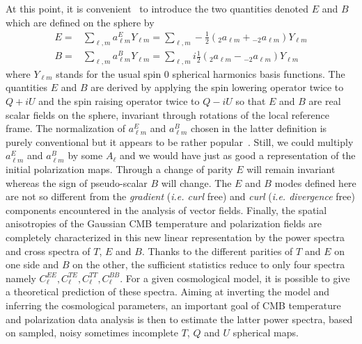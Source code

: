 At this point, it is convenient~\cite{zalda} to introduce the two quantities denoted $E$ and $B$ which are defined on the sphere by 
\begin{eqnarray}\label{EB}
E = &  \sum_{\ell, m}   a_{\ell m} ^E Y_{\ell m} =  \sum_{\ell, m}  - \frac{ 1}{2}   ({_{ 2}a_{\ell m}}  +  {_{- 2}a_{\ell m}} )    Y_{\ell m} \\ \nonumber
B = & \sum_{\ell, m}   a_{\ell m} ^B Y_{\ell m} =  \sum_{\ell, m}  i \frac{ 1}{2}    ({_{ 2}a_{\ell m}}  -  {_{- 2}a_{\ell m}} )   Y_{\ell m} 
\end{eqnarray} 
where $Y_{\ell m}$ stands for the usual spin 0 spherical harmonics basis functions. The quantities $E$ and $B$ are derived by applying 
the spin lowering operator twice to $Q + i U$  and the spin raising operator twice to $Q - i U$ so that $E$ and $B$ are real scalar 
fields on the sphere, invariant through rotations of the local reference frame. The normalization of $a_{\ell m} ^E$ and $a_{\ell m} ^B$ 
chosen in the latter definition is purely conventional but it appears to be rather popular~\cite{1997PhRvD..55.1830Z,2003PhRvD..67b3501B}. 
Still, we could multiply $a_{\ell m} ^E$ and $a_{\ell m} ^B$ by some $A_{\ell}$ and we would have just as good a representation of the initial 
polarization maps. Through a change of parity $E$ will remain invariant whereas the sign of pseudo-scalar $B$ will change. The $E$ and $B$ 
modes defined here are not so different from the \emph{gradient} (\emph{i.e. curl} free) and \emph{curl} (\emph{i.e. divergence} free) components 
encountered in the analysis of vector fields. Finally, the spatial anisotropies of the Gaussian CMB temperature and polarization fields are 
completely characterized in this new linear representation by the power spectra and cross spectra of $T$, $E$ and $B$. Thanks to the different 
parities of $T$ and $E$ on one side and $B$ on the other, the sufficient statistics reduce to only four spectra namely $C_\ell^{EE}, C_\ell^{TE}, 
C_\ell^{TT}, C_\ell^{BB}$. For a given cosmological model, it is possible to give a theoretical prediction of these spectra. Aiming at inverting 
the model and inferring the cosmological parameters, an important goal of CMB temperature and polarization data analysis is then to estimate the 
latter power spectra, based on sampled, noisy sometimes incomplete $T$, $Q$ and $U$ spherical maps.  

